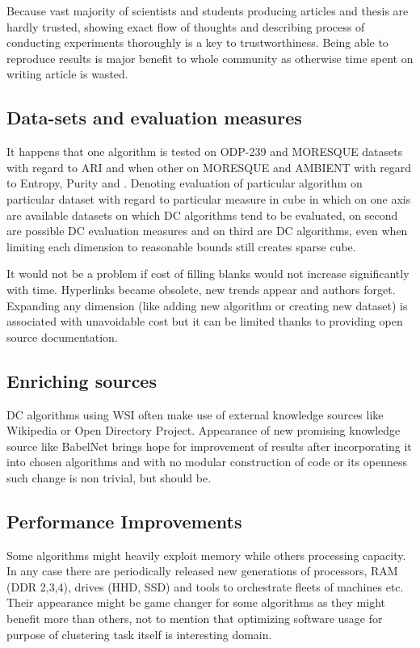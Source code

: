 \documentclass[a4paper, 12pt, oneside]{Thesis} %
\begin{document}
Because vast majority of scientists and students producing articles and thesis are hardly trusted, showing exact flow of thoughts and describing process of conducting experiments thoroughly is a key to trustworthiness. Being able to reproduce results is major benefit to whole community as otherwise time spent on writing article is wasted.

\subsection{Data-sets and evaluation measures} It happens that one algorithm is tested on ODP-239 and MORESQUE datasets with regard to ARI and  when other on MORESQUE and AMBIENT with regard to Entropy, Purity and . Denoting evaluation of particular algorithm on particular dataset with regard to particular measure in cube in which on one axis are available datasets on which DC algorithms tend to be evaluated, on second are possible DC evaluation measures and on third are DC algorithms, even when limiting each dimension to reasonable bounds still creates sparse cube. 

It would not be a problem if cost of filling blanks would not increase significantly with time. Hyperlinks became obsolete, new trends appear and authors forget. Expanding any dimension (like adding new algorithm or creating new dataset) is associated with unavoidable cost but it can be limited thanks to providing open source documentation. 

\subsection{Enriching sources} DC algorithms using WSI often make use of external knowledge sources like Wikipedia or Open Directory Project. Appearance of new promising knowledge source like BabelNet brings hope for improvement of results after incorporating it into chosen algorithms and with no modular construction of code or its openness such change is non trivial, but should be.

\subsection{Performance Improvements} Some algorithms might heavily exploit memory while others processing capacity. In any case there are periodically released new generations of processors, RAM (DDR 2,3,4), drives (HHD, SSD) and tools to orchestrate fleets of machines etc. Their appearance might be game changer for some algorithms as they might benefit more than others, not to mention that optimizing software usage for purpose of clustering task itself is interesting domain.
\end{document}
